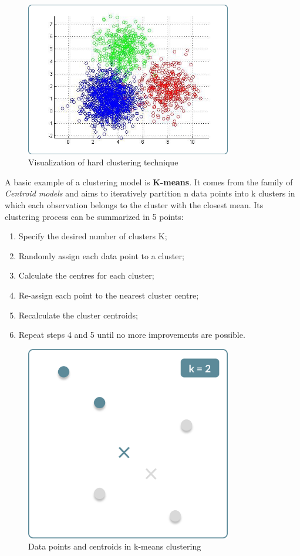     \begin{figure}[H]
        \centering
        \includegraphics[width=9cm]{Images/1/clustering.png}
        \caption{Visualization of hard clustering technique}
    \end{figure}
        
    
    A basic example of a clustering model is \textbf{K-means}. It comes from the family of \textit{Centroid models} and aims to iteratively partition n data points into k clusters in which each observation belongs to the cluster with the closest mean.
    Its clustering process can be summarized in 5 points:
    
    \begin{enumerate}
        \item Specify the desired number of clusters K;
        \item Randomly assign each data point to a cluster;
        \item Calculate the centres for each cluster;
        \item Re-assign each point to the nearest cluster centre;
        \item Recalculate the cluster centroids;
        \item Repeat steps 4 and 5 until no more improvements are possible.
    \end{enumerate}
    
    \begin{figure}[H]
        \centering
        \includegraphics[width=9cm]{Images/1/kmeans.png}
        \caption{Data points and centroids in k-means clustering}
    \end{figure}
    
